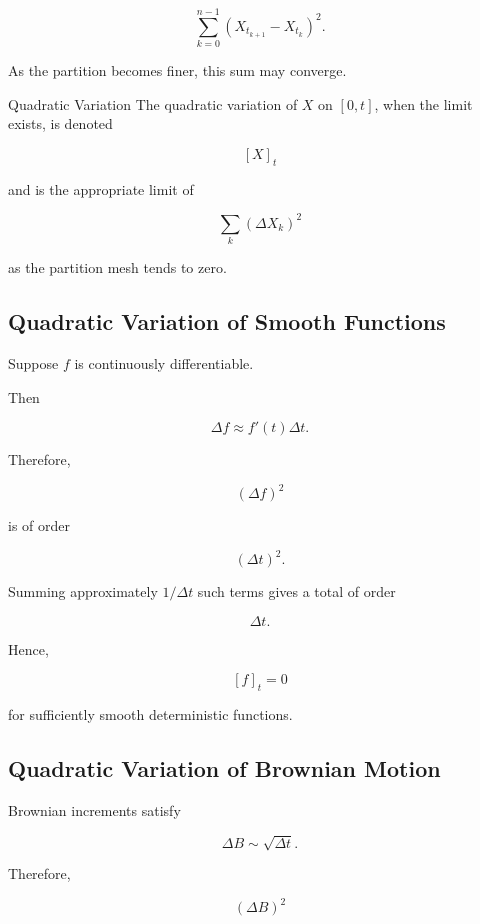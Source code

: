 \[
\boxed{
\sum_{k=0}^{n-1}
\left(
X_{t_{k+1}}-X_{t_k}
\right)^2.
}
\]

As the partition becomes finer, this sum may converge.

\begin{definitionbox}{Quadratic Variation}
The quadratic variation of \(X\) on \([0,t]\), when the limit exists,
is denoted

\[
\boxed{
[X]_t
}
\]

and is the appropriate limit of

\[
\sum_k
(\Delta X_k)^2
\]

as the partition mesh tends to zero.
\end{definitionbox}

\subsection{Quadratic Variation of Smooth Functions}
\label{subsec:qv-smooth-functions}

Suppose \(f\) is continuously differentiable.

Then

\[
\Delta f
\approx
f'(t)\Delta t.
\]

Therefore,

\[
(\Delta f)^2
\]

is of order

\[
(\Delta t)^2.
\]

Summing approximately \(1/\Delta t\) such terms gives a total of order

\[
\Delta t.
\]

Hence,

\[
\boxed{
[f]_t=0
}
\]

for sufficiently smooth deterministic functions.

\subsection{Quadratic Variation of Brownian Motion}
\label{subsec:qv-brownian}

Brownian increments satisfy

\[
\Delta B
\sim
\sqrt{\Delta t}.
\]

Therefore,

\[
(\Delta B)^2
\]

